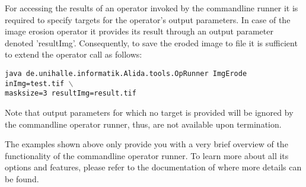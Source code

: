 For accessing the results of an operator invoked by the commandline runner it is required to 
specify targets for the operator's output parameters. In case of the image erosion operator it provides
its result through an output parameter denoted 'resultImg'. Consequently, to save the eroded image to 
file it is sufficient to extend the operator call as follows: 
\begin{center}
{\tt java  de.unihalle.informatik.Alida.tools.OpRunner ImgErode inImg=test.tif
$\backslash$\\
\hspace*{5cm} masksize=3 resultImg=result.tif}
\end{center}
Note that output parameters for which no target is provided will be ignored by the commandline 
operator runner, thus, are not available upon termination.

The examples shown above only provide you with a very brief overview of the functionality of the 
commandline operator runner. To learn more about all its options and features, please refer to 
the documentation of \alida where more details can be found.  